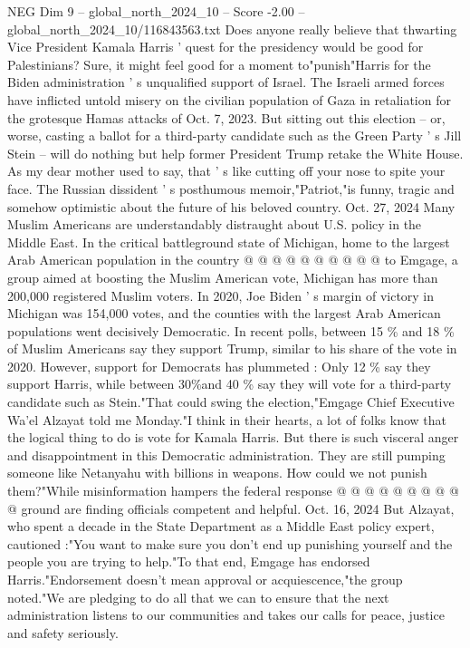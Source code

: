 \begin{textsample}{NEG Dim 9 – global\_north\_2024\_10 – Score -2.00 – global\_north\_2024\_10/116843563.txt}  \label{ex:f9_neg_231}
Does anyone really believe that thwarting Vice President Kamala Harris ' quest for the presidency would be good for Palestinians?
Sure, it might feel good for a moment to"punish"Harris for the Biden administration ' s unqualified support of Israel.
The Israeli armed forces have inflicted untold misery on the civilian population of Gaza in retaliation for the grotesque Hamas attacks of Oct. 7, 2023.
But sitting out this election -- or, worse, casting a ballot for a third-party candidate such as the Green Party ' s Jill Stein -- will do nothing but help former President Trump retake the White House.
As my dear mother used to say, that ' s like cutting off your nose to spite your face.
The Russian dissident ' s posthumous memoir,"Patriot,"is funny, tragic and somehow optimistic about the future of his beloved country.
Oct. 27, 2024 Many Muslim Americans are understandably distraught about U.S. policy in the Middle East.
In the critical battleground state of Michigan, home to the largest Arab American population in the country @ @ @ @ @ @ @ @ @ @ to Emgage, a group aimed at boosting the Muslim American vote, Michigan has more than 200,000 registered Muslim voters.
In 2020, Joe Biden ' s margin of victory in Michigan was 154,000 votes, and the counties with the largest Arab American populations went decisively Democratic.
In recent polls, between 15 \% and 18 \% of Muslim Americans say they support Trump, similar to his share of the vote in 2020.
However, support for Democrats has plummeted : Only 12 \% say they support Harris, while between 30\%and 40 \% say they will vote for a third-party candidate such as Stein."That could swing the election,"Emgage Chief Executive Wa'el Alzayat told me Monday."I think in their hearts, a lot of folks know that the logical thing to do is vote for Kamala Harris.
But there is such visceral anger and disappointment in this Democratic administration.
They are still pumping someone like Netanyahu with billions in weapons.
How could we not punish them?"While misinformation hampers the federal response @ @ @ @ @ @ @ @ @ @ ground are finding officials competent and helpful.
Oct. 16, 2024 But Alzayat, who spent a decade in the State Department as a Middle East policy expert, cautioned :"You want to make sure you don't end up punishing yourself and the people you are trying to help."To that end, Emgage has endorsed Harris."Endorsement doesn't mean approval or acquiescence,"the group noted."We are pledging to do all that we can to ensure that the next administration listens to our communities and takes our calls for peace, justice and safety seriously.

\end{textsample}
